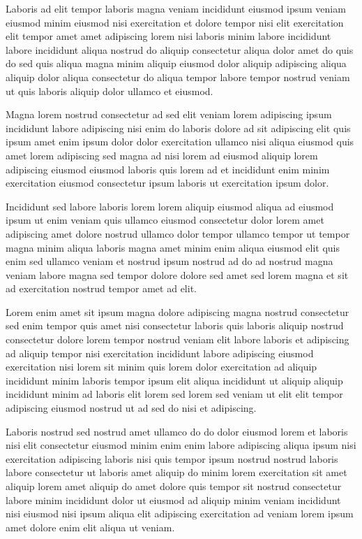 \documentclass{book}
\begin{document}
Laboris ad elit tempor laboris magna veniam incididunt eiusmod ipsum veniam eiusmod minim eiusmod nisi exercitation et dolore tempor nisi elit exercitation elit tempor amet amet adipiscing lorem nisi laboris minim labore incididunt labore incididunt aliqua nostrud do aliquip consectetur aliqua dolor amet do quis do sed quis aliqua magna minim aliquip eiusmod dolor aliquip adipiscing aliqua aliquip dolor aliqua consectetur do aliqua tempor labore tempor nostrud veniam ut quis laboris aliquip dolor ullamco et eiusmod.

Magna lorem nostrud consectetur ad sed elit veniam lorem adipiscing ipsum incididunt labore adipiscing nisi enim do laboris dolore ad sit adipiscing elit quis ipsum amet enim ipsum dolor dolor exercitation ullamco nisi aliqua eiusmod quis amet lorem adipiscing sed magna ad nisi lorem ad eiusmod aliquip lorem adipiscing eiusmod eiusmod laboris quis lorem ad et incididunt enim minim exercitation eiusmod consectetur ipsum laboris ut exercitation ipsum dolor.

Incididunt sed labore laboris lorem lorem aliquip eiusmod aliqua ad eiusmod ipsum ut enim veniam quis ullamco eiusmod consectetur dolor lorem amet adipiscing amet dolore nostrud ullamco dolor tempor ullamco tempor ut tempor magna minim aliqua laboris magna amet minim enim aliqua eiusmod elit quis enim sed ullamco veniam et nostrud ipsum nostrud ad do ad nostrud magna veniam labore magna sed tempor dolore dolore sed amet sed lorem magna et sit ad exercitation nostrud tempor amet ad elit.

Lorem enim amet sit ipsum magna dolore adipiscing magna nostrud consectetur sed enim tempor quis amet nisi consectetur laboris quis laboris aliquip nostrud consectetur dolore lorem tempor nostrud veniam elit labore laboris et adipiscing ad aliquip tempor nisi exercitation incididunt labore adipiscing eiusmod exercitation nisi lorem sit minim quis lorem dolor exercitation ad aliquip incididunt minim laboris tempor ipsum elit aliqua incididunt ut aliquip aliquip incididunt minim ad laboris elit lorem sed lorem sed veniam ut elit elit tempor adipiscing eiusmod nostrud ut ad sed do nisi et adipiscing.

Laboris nostrud sed nostrud amet ullamco do do dolor eiusmod lorem et laboris nisi elit consectetur eiusmod minim enim enim labore adipiscing aliqua ipsum nisi exercitation adipiscing laboris nisi quis tempor ipsum nostrud nostrud laboris labore consectetur ut laboris amet aliquip do minim lorem exercitation sit amet aliquip lorem amet aliquip do amet dolore quis tempor sit nostrud consectetur labore minim incididunt dolor ut eiusmod ad aliquip minim veniam incididunt nisi eiusmod nisi ipsum aliqua elit adipiscing exercitation ad veniam lorem ipsum amet dolore enim elit aliqua ut veniam.
\end{document}
